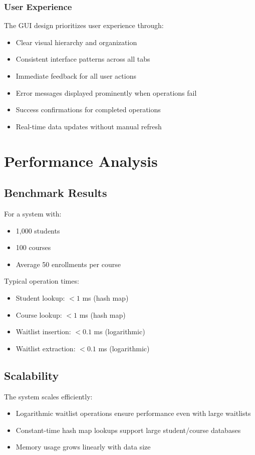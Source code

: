\documentclass[12pt,a4paper]{article}
\begin{document}
\subsubsection{User Experience}

The GUI design prioritizes user experience through:

\begin{itemize}
    \item Clear visual hierarchy and organization
    \item Consistent interface patterns across all tabs
    \item Immediate feedback for all user actions
    \item Error messages displayed prominently when operations fail
    \item Success confirmations for completed operations
    \item Real-time data updates without manual refresh
\end{itemize}

\section{Performance Analysis}

\subsection{Benchmark Results}
For a system with:
\begin{itemize}
    \item 1,000 students
    \item 100 courses
    \item Average 50 enrollments per course
\end{itemize}

Typical operation times:
\begin{itemize}
    \item Student lookup: $< 1$ ms (hash map)
    \item Course lookup: $< 1$ ms (hash map)
    \item Waitlist insertion: $< 0.1$ ms (logarithmic)
    \item Waitlist extraction: $< 0.1$ ms (logarithmic)
\end{itemize}

\subsection{Scalability}
The system scales efficiently:
\begin{itemize}
    \item Logarithmic waitlist operations ensure performance even with large waitlists
    \item Constant-time hash map lookups support large student/course databases
    \item Memory usage grows linearly with data size
\end{itemize}
\end{document}
